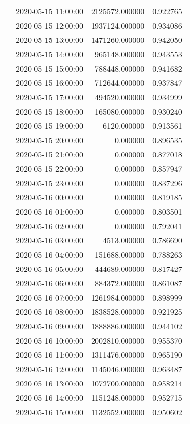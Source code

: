 \begin{tabular}{llrr}
 & 2020-05-15 11:00:00 & 2125572.000000 & 0.922765 \\
 & 2020-05-15 12:00:00 & 1937124.000000 & 0.934086 \\
 & 2020-05-15 13:00:00 & 1471260.000000 & 0.942050 \\
 & 2020-05-15 14:00:00 & 965148.000000 & 0.943553 \\
 & 2020-05-15 15:00:00 & 788448.000000 & 0.941682 \\
 & 2020-05-15 16:00:00 & 712644.000000 & 0.937847 \\
 & 2020-05-15 17:00:00 & 494520.000000 & 0.934999 \\
 & 2020-05-15 18:00:00 & 165080.000000 & 0.930240 \\
 & 2020-05-15 19:00:00 & 6120.000000 & 0.913561 \\
 & 2020-05-15 20:00:00 & 0.000000 & 0.896535 \\
 & 2020-05-15 21:00:00 & 0.000000 & 0.877018 \\
 & 2020-05-15 22:00:00 & 0.000000 & 0.857947 \\
 & 2020-05-15 23:00:00 & 0.000000 & 0.837296 \\
 & 2020-05-16 00:00:00 & 0.000000 & 0.819185 \\
 & 2020-05-16 01:00:00 & 0.000000 & 0.803501 \\
 & 2020-05-16 02:00:00 & 0.000000 & 0.792041 \\
 & 2020-05-16 03:00:00 & 4513.000000 & 0.786690 \\
 & 2020-05-16 04:00:00 & 151688.000000 & 0.788263 \\
 & 2020-05-16 05:00:00 & 444689.000000 & 0.817427 \\
 & 2020-05-16 06:00:00 & 884372.000000 & 0.861087 \\
 & 2020-05-16 07:00:00 & 1261984.000000 & 0.898999 \\
 & 2020-05-16 08:00:00 & 1838528.000000 & 0.921925 \\
 & 2020-05-16 09:00:00 & 1888886.000000 & 0.944102 \\
 & 2020-05-16 10:00:00 & 2002810.000000 & 0.955370 \\
 & 2020-05-16 11:00:00 & 1311476.000000 & 0.965190 \\
 & 2020-05-16 12:00:00 & 1145046.000000 & 0.963487 \\
 & 2020-05-16 13:00:00 & 1072700.000000 & 0.958214 \\
 & 2020-05-16 14:00:00 & 1151248.000000 & 0.952715 \\
 & 2020-05-16 15:00:00 & 1132552.000000 & 0.950602 \\

\end{tabular}

